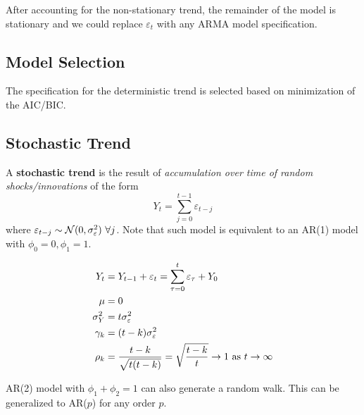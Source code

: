 \documentclass[11pt]{article}
\begin{document}
    		\begin{remark}
    		    After accounting for the non-stationary trend, the remainder of the model is stationary and we could replace $\varepsilon_t$ with any ARMA model specification.
    		 \end{remark}
    		
    	\subsection{Model Selection}
    		\begin{remark}
    		    The specification for the deterministic trend is selected based on minimization of the AIC/BIC.
    		\end{remark}

    	\subsection{Stochastic Trend}
    	    \begin{definition}
    	        A \textbf{stochastic trend} is the result of \emph{accumulation over time of random shocks/innovations} of the form
    	        \begin{equation}
    	            Y_t = \sum_{j=0}^{t-1} \varepsilon_{t-j}
    	        \end{equation}
    	        where $\varepsilon_{t-j} \sim \mathcal{{N}}(0, \sigma_\varepsilon^2)\ \forall j$. Note that such model is equivalent to an AR(1) model with $\phi_0 = 0, \phi_1 = 1$.
    	    \end{definition}
    	    
    	    \begin{example}
    	        \begin{align}
    	            Y_t &= Y_{t-1} + \varepsilon_t = \sum_{\tau=0}^{t} \varepsilon_\tau + Y_0 \\
    	            \mu &= 0 \\
    	            \sigma_Y^2 &= t \sigma_\varepsilon^2 \\
    	            \gamma_k &= (t-k) \sigma_\varepsilon^2 \\
    	            \rho_k &= \frac{t-k}{\sqrt{t (t-k)}} = \sqrt{\frac{t-k}{t}} \to 1 \text{{ as }} t \to \infty
    	        \end{align}
    	    \end{example}
    	    
    	    \begin{remark}
    	        AR(2) model with $\phi_1 + \phi_2 = 1$ can also generate a random walk. This can be generalized to AR($p$) for any order $p$.
    	    \end{remark}
    	    
\end{document}

